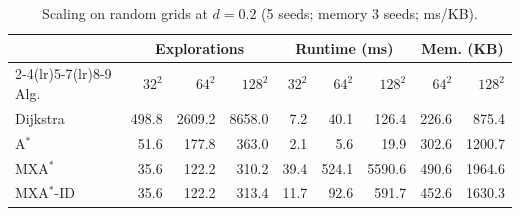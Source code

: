 \begin{table}[t]
\centering
\caption{Scaling on random grids at $d=0.2$ (5 seeds; memory 3 seeds; ms/KB).}
\label{tab:scaling}
\footnotesize
\setlength{\tabcolsep}{2.0pt}
\begin{tabular}{lrrrrrrrr}
\toprule
& \multicolumn{3}{c}{Explorations} & \multicolumn{3}{c}{Runtime (ms)} & \multicolumn{2}{c}{Mem. (KB)} \\
\cmidrule(lr){2-4}\cmidrule(lr){5-7}\cmidrule(lr){8-9}
Alg. & $32^2$ & $64^2$ & $128^2$ & $32^2$ & $64^2$ & $128^2$ & $64^2$ & $128^2$ \\
\midrule
Dijkstra & 498.8 & 2609.2 & 8658.0 & 7.2 & 40.1 & 126.4 & 226.6 & 875.4 \\
A$^*$ & 51.6 & 177.8 & 363.0 & 2.1 & 5.6 & 19.9 & 302.6 & 1200.7 \\
MXA$^*$ & 35.6 & 122.2 & 310.2 & 39.4 & 524.1 & 5590.6 & 490.6 & 1964.6 \\
MXA$^*$-ID & 35.6 & 122.2 & 313.4 & 11.7 & 92.6 & 591.7 & 452.6 & 1630.3 \\
\bottomrule
\end{tabular}
\end{table}
